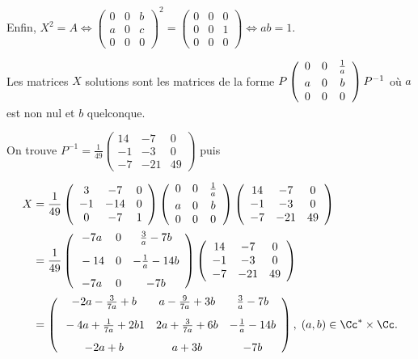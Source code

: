 {{Enfin, $X^2=A\Leftrightarrow\left(
\begin{array}{ccc}
0&0&b\\
a&0&c\\
0&0&0
\end{array}
\right)^2=\left(
\begin{array}{ccc}
0&0&0\\
0&0&1\\
0&0&0
\end{array}
\right)\Leftrightarrow ab = 1$.

Les matrices $X$ solutions sont les matrices de la forme $P\left(
\begin{array}{ccc}
0&0&\frac{1}{a}\\
a&0&b\rule{0mm}{4mm}\\
0&0&0
\end{array}
\right)P^{-1}$ où $a$ est non nul et $b$ quelconque.

On trouve $P^{-1}=\frac{1}{49}\left(
\begin{array}{ccc}
14&-7&0\\
-1&-3&0\\
-7&-21&49
\end{array}
\right)$  puis

\begin{align*}\ensuremath
X&=\frac{1}{49}\left(
\begin{array}{ccc}
3&-7&0\\
-1&-14&0\\
0&-7&1
\end{array}
\right)\left(
\begin{array}{ccc}
0&0&\frac{1}{a}\\
a&0&b\rule{0mm}{4mm}\\
0&0&0
\end{array}
\right)\left(
\begin{array}{ccc}
14&-7&0\\
-1&-3&0\\
-7&-21&49
\end{array}
\right)\\
 &=\frac{1}{49}\left(
\begin{array}{ccc}
-7a&0&\frac{3}{a}-7b\\
\rule[-4mm]{0mm}{10mm}-14&0&-\frac{1}{a}-14b\\
-7a&0&-7b
\end{array}
\right)\left(
\begin{array}{ccc}
14&-7&0\\
-1&-3&0\\
-7&-21&49
\end{array}
\right)\\
&=\left(
\begin{array}{ccc}
-2a-\frac{3}{7a}+b&a-\frac{9}{7a}+3b&\frac{3}{a}-7b\\
\rule[-4mm]{0mm}{10mm}-4a+\frac{1}{7a}+2b1&2a+\frac{3}{7a}+6b&-\frac{1}{a}-14b\\
-2a+b&a+3b&-7b
\end{array}
\right),\;(a,b)\in\Cc^*\times\Cc.
\end{align*}}
}